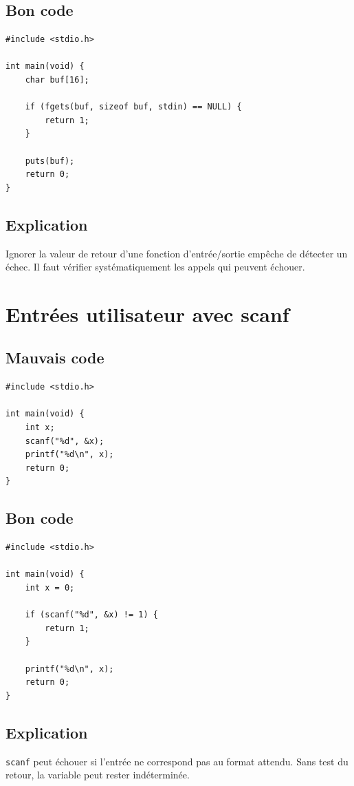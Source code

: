 \documentclass[a4paper,11pt]{report}
\begin{document}
\section{Bon code}
\begin{lstlisting}
#include <stdio.h>

int main(void) {
    char buf[16];

    if (fgets(buf, sizeof buf, stdin) == NULL) {
        return 1;
    }

    puts(buf);
    return 0;
}
\end{lstlisting}

\section{Explication}
Ignorer la valeur de retour d'une fonction d'entrée/sortie empêche de détecter un échec.
Il faut vérifier systématiquement les appels qui peuvent échouer.

\chapter{Entrées utilisateur avec scanf}

\section{Mauvais code}
\begin{lstlisting}
#include <stdio.h>

int main(void) {
    int x;
    scanf("%d", &x);
    printf("%d\n", x);
    return 0;
}
\end{lstlisting}

\section{Bon code}
\begin{lstlisting}
#include <stdio.h>

int main(void) {
    int x = 0;

    if (scanf("%d", &x) != 1) {
        return 1;
    }

    printf("%d\n", x);
    return 0;
}
\end{lstlisting}

\section{Explication}
\texttt{scanf} peut échouer si l'entrée ne correspond pas au format attendu.
Sans test du retour, la variable peut rester indéterminée.
\end{document}
